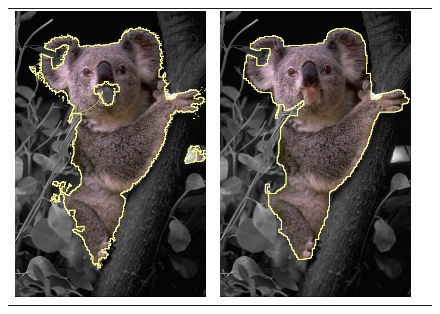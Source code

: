 \documentclass[smallextended]{svjour3}       %
\begin{document}
{{\begin{figure}[ht!]
\begin{tabular}{ccc}
 	\includegraphics[scale=0.25]{images/segmentation/bc/coala/lg0_sq0_dt1_it20.png} & 
	\includegraphics[scale=0.25]{images/segmentation/bc/coala/r3/lg1_sq0_dt1_it50.png} &

\end{tabular}
\end{figure}}}
\end{document}
